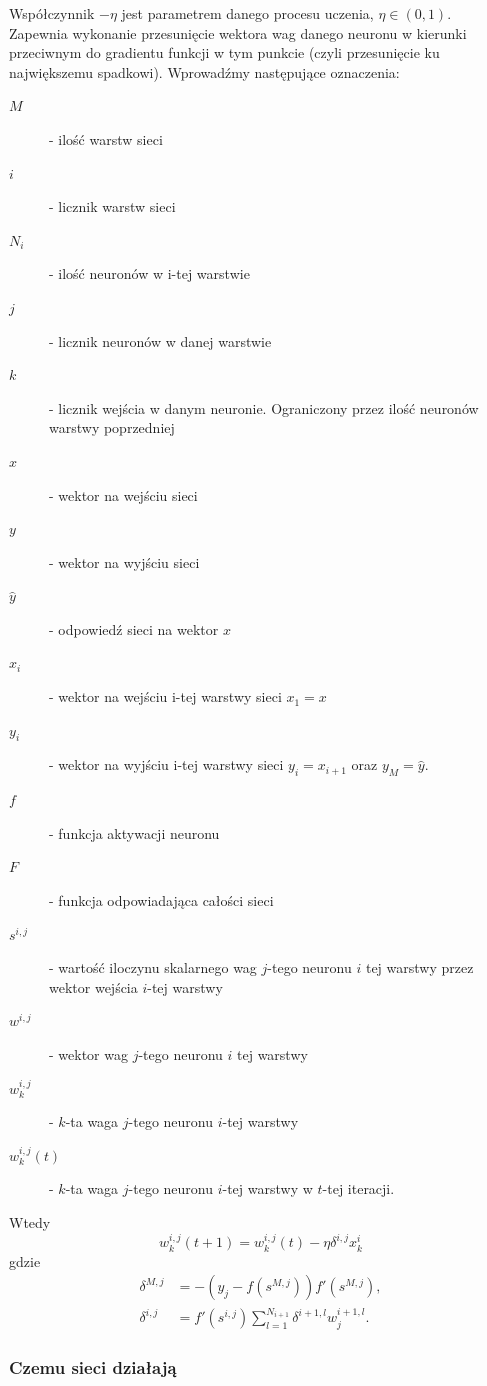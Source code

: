\documentclass[10pt,a4paper]{book}
\begin{document}
Współczynnik $-\eta$ jest parametrem danego procesu uczenia, $\eta \in (0,1)$. Zapewnia wykonanie przesunięcie wektora wag danego neuronu w kierunki przeciwnym do gradientu funkcji w tym punkcie (czyli przesunięcie ku największemu spadkowi).  Wprowadźmy następujące oznaczenia:
\begin{description}
\item[$M$] - ilość warstw sieci
\item[$i$] - licznik warstw sieci
\item[$N_i$] - ilość neuronów w i-tej warstwie
\item[$j$] - licznik neuronów w danej warstwie
\item[$k$] - licznik wejścia w danym neuronie. Ograniczony przez ilość neuronów warstwy poprzedniej
\item[$x$] - wektor na wejściu sieci
\item[$y$] - wektor na wyjściu sieci
\item[$\hat{y}$] - odpowiedź sieci na wektor $x$
\item[$x_i$] - wektor na wejściu i-tej warstwy sieci $x_1 = x$
\item[$y_i$] - wektor na wyjściu i-tej warstwy sieci $y_i = x_{i+1}$ oraz $y_M = \hat{y}$.
\item[$f$] - funkcja aktywacji neuronu
\item[$F$] - funkcja odpowiadająca całości sieci
\item[$s^{i,j}$] - wartość iloczynu skalarnego wag $j$-tego neuronu $i$ tej warstwy przez wektor wejścia $i$-tej warstwy
\item[$w^{i,j}$] - wektor wag $j$-tego neuronu $i$ tej warstwy
\item[$w^{i,j}_k$] - $k$-ta waga $j$-tego neuronu $i$-tej warstwy
\item[$w^{i,j}_k(t)$] - $k$-ta waga $j$-tego neuronu $i$-tej warstwy w $t$-tej iteracji.
\end{description}

Wtedy 
\begin{equation*}
w^{i,j}_k (t+1) = w^{i,j}_k(t) - \eta \delta^{i,j} x^{i}_k
\end{equation*}
gdzie
\begin{eqnarray*}
\delta^{M,j} &= -( y_j - f(s^{M,j} ))  f'(s^{M,j}), \\
\delta^{i,j} &= f'(s^{i,j}) \sum_{l=1}^{N_{i+1}} \delta^{i+1,l} w^{i+1,l}_j.
\end{eqnarray*}

\subsubsection{Czemu sieci działają}
\end{document}
